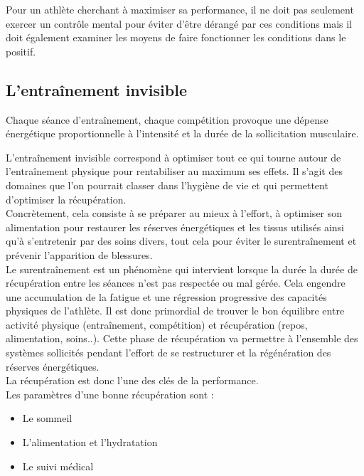             Pour un athlète cherchant à maximiser sa performance, il ne doit pas seulement exercer un contrôle mental pour éviter d'être dérangé par ces conditions mais il doit également examiner les moyens de faire fonctionner les conditions dans le positif.
            
            
        \vspace{10pt}
             
             
        \subsection{L'entraînement invisible}
         
            Chaque séance d’entraînement, chaque compétition provoque une dépense énergétique proportionnelle à l’intensité et la durée de la sollicitation musculaire. 
             
            L'entraînement invisible correspond à optimiser tout ce qui tourne autour de l'entraînement physique pour rentabiliser au maximum ses effets. Il s’agit des domaines que l’on pourrait classer dans l’hygiène de vie et qui permettent d'optimiser la récupération. \\
            
            Concrètement, cela consiste à se préparer au mieux à l’effort, à optimiser son alimentation pour restaurer les réserves énergétiques et les tissus utilisés ainsi qu'à s'entretenir par des soins divers, tout cela pour éviter le surentraînement et prévenir l'apparition de blessures.\\
            
            Le surentraînement est un phénomène qui intervient lorsque la durée la durée de récupération entre les séances n’est pas respectée ou mal gérée. Cela engendre une accumulation de la fatigue et une régression progressive des capacités physiques de l'athlète. Il est donc primordial de trouver le  bon équilibre entre activité physique (entraînement, compétition) et récupération (repos, alimentation, soins..). Cette phase de récupération va permettre à l'ensemble des systèmes sollicités pendant l’effort de se restructurer et la régénération des réserves énergétiques.\\
              
            La récupération est donc l'une des clés de la performance.\\
    
            Les paramètres d'une bonne récupération sont : 
             \begin{itemize}
                 \item Le sommeil
                 \item L'alimentation et l'hydratation
                 \item Le suivi médical
             \end{itemize}
             
